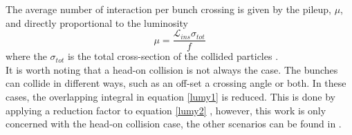 The average number of interaction per bunch crossing is given by the pileup, $\mu$, and directly proportional to the luminosity
\begin{equation}
    \mu=\frac{\mathcal{L}_{ins}\sigma_{tot}}{f}
    \label{pileup}
\end{equation}
where the $\sigma_{tot}$ is the total cross-section of the collided particles \cite{CERN-THESIS-2018-051}.\\
It is worth noting that a head-on collision is not always the case. The bunches can collide in different ways, such as an off-set a crossing angle or both. In these cases, the overlapping integral in equation \ref{lumy1} is reduced. This is done by applying a reduction factor to equation \ref{lumy2} \cite{CERN-THESIS-2018-051}, however, this work is only concerned with the head-on collision case, the other scenarios can be found in \cite{White}.
